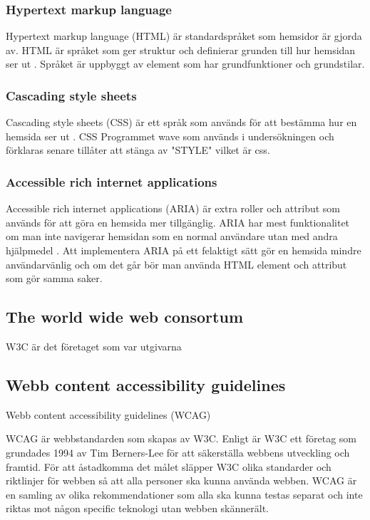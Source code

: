 \documentclass[11p]{article}
\begin{document}
    \subsubsection{Hypertext markup language}
    Hypertext markup language (HTML) är standardspråket som hemsidor är gjorda av.
    HTML är språket som ger struktur och definierar grunden till hur hemsidan ser ut \parencite{HTML}.
    Språket är uppbyggt av element som har grundfunktioner och grundstilar.
    
    \subsubsection{Cascading style sheets}
    Cascading style sheets (CSS) är ett språk som används för att bestämma hur en hemsida ser ut \parencite{CSS}.
    CSS
    Programmet wave som används i undersökningen och förklaras senare tillåter att stänga av "STYLE" vilket är css.
    
    \subsubsection{Accessible rich internet applications}
    Accessible rich internet applications (ARIA) är extra roller och attribut som används för att göra en hemsida mer tillgänglig.
    ARIA har mest funktionalitet om man inte navigerar hemsidan som en normal användare utan med andra hjälpmedel \parencite{ARIA}.
    Att implementera ARIA på ett felaktigt sätt gör en hemsida mindre användarvänlig och om det går bör man använda HTML element och attribut som gör samma saker.
    
    \subsection{The world wide web consortum}
    W3C är det företaget som var utgivarna

    \subsection{Webb content accessibility guidelines}
    Webb content accessibility guidelines (WCAG)

    WCAG är webbstandarden som skapas av W3C.
    Enligt \textcite{W3C} är W3C ett företag som grundades 1994 av Tim Berners-Lee för att säkerställa webbens utveckling och framtid.
    För att åstadkomma det målet släpper W3C olika standarder och riktlinjer för webben så att alla personer ska kunna använda webben.
    WCAG är en samling av olika rekommendationer som alla ska kunna testas separat och inte riktas mot någon specific teknologi utan webben skännerält. \parencite{WCAG_2.0}
\end{document}
